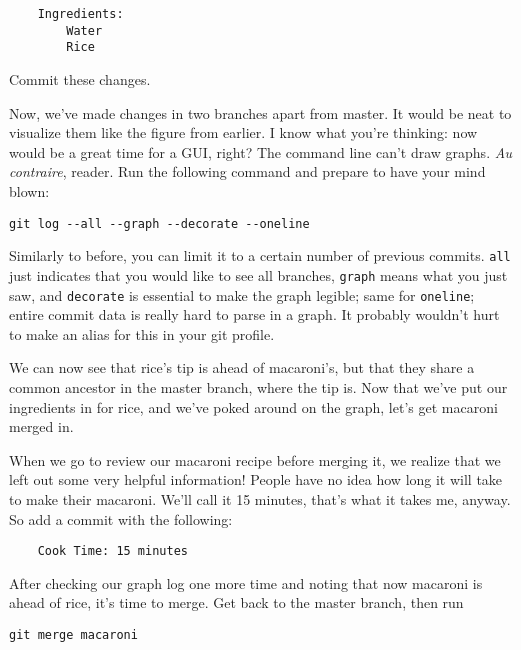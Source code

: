 \begin{verbatim}
    Ingredients:
        Water
        Rice
\end{verbatim}

\par{
Commit these changes.
}

\par{
Now, we've made changes in two branches apart from master. It would be neat to
visualize them like the figure from earlier. 
I know what you're thinking: now would be a great time for a
GUI, right? The command line can't draw graphs. \emph{Au contraire}, reader. 
Run the following command and prepare to have your mind blown:
}

\begin{verbatim}
git log --all --graph --decorate --oneline
\end{verbatim}

\par{
Similarly to before, you can limit it to a certain number of previous commits.
\verb+all+ just indicates that you would like to see all branches,
\verb+graph+ means what you just saw, and \verb+decorate+ is essential to make
the graph legible; same for \verb+oneline+; entire commit data is really hard
to parse in a graph. It probably wouldn't hurt to make an alias for this in
your git profile.
}

\par{
We can now see that rice's tip is ahead of macaroni's, but that they share a
common ancestor in the master branch, where the tip is. 
Now that we've put our ingredients in
for rice, and we've poked around on the graph, let's get macaroni merged in.
}

\par{
When we go to review our macaroni recipe before merging it, we realize that we
left out some very helpful information! People have no idea how long it will
take to make their macaroni. We'll call it 15 minutes, that's what it takes
me, anyway. So add a commit with the following:
}

\begin{verbatim}
    Cook Time: 15 minutes
\end{verbatim}

\par{
After checking our graph log one more time and noting that now macaroni is
ahead of rice, it's time to merge. Get back to the master branch, then run
}

\begin{verbatim}
git merge macaroni
\end{verbatim}

